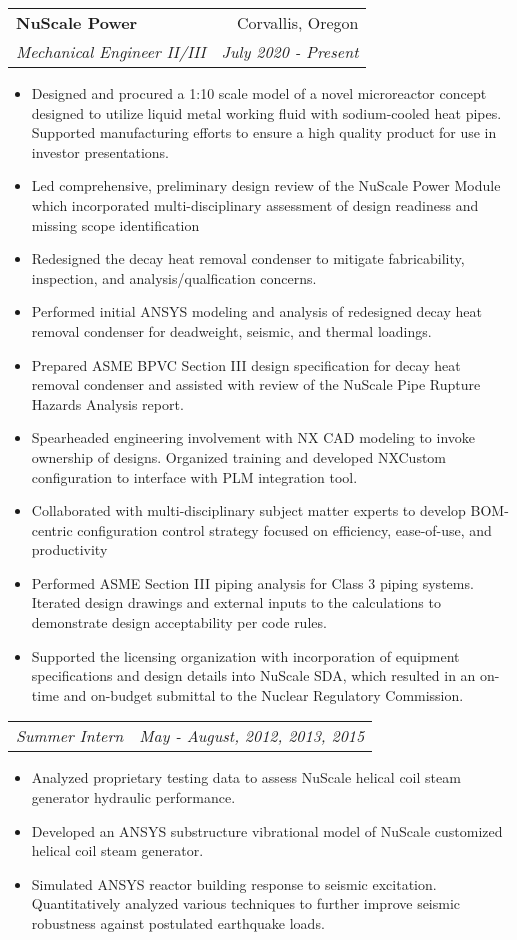 \documentclass[letterpaper,11pt]{article}
\makeatletter
\newcommand{\resumeSubheading}[4]{
  \vspace{-1pt}\item
    \begin{tabular*}{0.97\textwidth}[t]{l@{\extracolsep{\fill}}r}
      \textbf{#1} & #2 \\
      \textit{\small#3} & \textit{\small #4} \\
    \end{tabular*}\vspace{-5pt}
}
\newcommand{\resumeSubSubheading}[2]{
    \begin{tabular*}{0.97\textwidth}{l@{\extracolsep{\fill}}r}
      \textit{\small#1} & \textit{\small #2} \\
    \end{tabular*}\vspace{-5pt}
}
\newcommand{\resumeItemListStart}{\begin{itemize}}
\newcommand{\resumeItemListEnd}{\end{itemize}\vspace{-5pt}}
\makeatother
\begin{document}
    \resumeSubheading
      {NuScale Power}{Corvallis, Oregon}
      {Mechanical Engineer II/III}{July 2020 - Present}
      \resumeItemListStart
        	\item{Designed and procured a 1:10 scale model of a novel microreactor concept designed to utilize liquid metal working fluid with sodium-cooled heat pipes. Supported manufacturing efforts to ensure a high quality product for use in investor presentations.}
	\item{Led comprehensive, preliminary design review of the NuScale Power Module which incorporated multi-disciplinary assessment of design readiness and missing scope identification}
	\item{Redesigned the decay heat removal condenser to mitigate fabricability, inspection, and analysis/qualfication concerns.}
	\item{Performed initial ANSYS modeling and analysis of redesigned decay heat removal condenser for deadweight, seismic, and thermal loadings.}
        	\item{Prepared ASME BPVC Section III design specification for decay heat removal condenser and assisted with review of the NuScale Pipe Rupture Hazards Analysis report.}
	\item{Spearheaded engineering involvement with NX CAD modeling to invoke ownership of designs. Organized training and developed NXCustom configuration to interface with PLM integration tool.}
        	\item{Collaborated with multi-disciplinary subject matter experts to develop BOM-centric configuration control strategy focused on efficiency, ease-of-use, and productivity}
	\item{Performed ASME Section III piping analysis for Class 3 piping systems. Iterated design drawings and external inputs to the calculations to demonstrate design acceptability per code rules.}
	\item{Supported the licensing organization with incorporation of equipment specifications and design details into NuScale SDA, which resulted in an on-time and on-budget submittal to the Nuclear Regulatory Commission.}
      \resumeItemListEnd
\resumeSubSubheading
      {Summer Intern}{May - August, 2012, 2013, 2015}
      \resumeItemListStart
        	\item{Analyzed proprietary testing data to assess NuScale helical coil steam generator hydraulic performance.}
	\item{Developed an ANSYS substructure vibrational model of NuScale customized helical coil steam generator.}
	\item{Simulated ANSYS reactor building response to seismic excitation. Quantitatively analyzed various techniques to further improve seismic robustness against postulated earthquake loads.}
      \resumeItemListEnd
      
\end{document}
